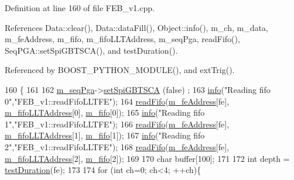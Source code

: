 Definition at line 160 of file F\+E\+B\+\_\+v1.\+cpp.



References Data\+::clear(), Data\+::data\+Fill(), Object\+::info(), m\+\_\+ch, m\+\_\+data, m\+\_\+fe\+Address, m\+\_\+fifo, m\+\_\+fifo\+L\+L\+T\+Address, m\+\_\+seq\+Pga, read\+Fifo(), Seq\+P\+G\+A\+::set\+Spi\+G\+B\+T\+S\+C\+A(), and test\+Duration().



Referenced by B\+O\+O\+S\+T\+\_\+\+P\+Y\+T\+H\+O\+N\+\_\+\+M\+O\+D\+U\+L\+E(), and ext\+Trig().


\begin{DoxyCode}
160                                              \{
161 
162   \hyperlink{classFEB__v1_a6c7804ac86796f233a8393043adf2e77}{m\_seqPga}->\hyperlink{classSeqPGA_ae5449d6970bffd8de3670a8a1ce6942d}{setSpiGBTSCA} (\textcolor{keyword}{false}) ;
163   \hyperlink{classObject_a644fd329ea4cb85f54fa6846484b84a8}{info}(\textcolor{stringliteral}{"Reading fifo 0"},\textcolor{stringliteral}{"FEB\_v1::readFifoLLTFE"});
164   \hyperlink{classFEB__v1_af945f99a912c5ad076ebdb03dbb6c139}{readFifo}(\hyperlink{classFEB__v1_a4e1945c2d5b434125f375e9d0fc6d99f}{m\_feAddress}[fe], \hyperlink{classFEB__v1_a68be75ba59d1c551163a9596dc1d235a}{m\_fifoLLTAddress}[0], 
      \hyperlink{classFEB__v1_ae5b770f2f5ffb97324862c93e3153985}{m\_fifo}[0]);
165   \hyperlink{classObject_a644fd329ea4cb85f54fa6846484b84a8}{info}(\textcolor{stringliteral}{"Reading fifo 1"},\textcolor{stringliteral}{"FEB\_v1::readFifoLLTFE"});
166   \hyperlink{classFEB__v1_af945f99a912c5ad076ebdb03dbb6c139}{readFifo}(\hyperlink{classFEB__v1_a4e1945c2d5b434125f375e9d0fc6d99f}{m\_feAddress}[fe], \hyperlink{classFEB__v1_a68be75ba59d1c551163a9596dc1d235a}{m\_fifoLLTAddress}[1], 
      \hyperlink{classFEB__v1_ae5b770f2f5ffb97324862c93e3153985}{m\_fifo}[1]);
167   \hyperlink{classObject_a644fd329ea4cb85f54fa6846484b84a8}{info}(\textcolor{stringliteral}{"Reading fifo 2"},\textcolor{stringliteral}{"FEB\_v1::readFifoLLTFE"});
168   \hyperlink{classFEB__v1_af945f99a912c5ad076ebdb03dbb6c139}{readFifo}(\hyperlink{classFEB__v1_a4e1945c2d5b434125f375e9d0fc6d99f}{m\_feAddress}[fe], \hyperlink{classFEB__v1_a68be75ba59d1c551163a9596dc1d235a}{m\_fifoLLTAddress}[2], 
      \hyperlink{classFEB__v1_ae5b770f2f5ffb97324862c93e3153985}{m\_fifo}[2]);
169   
170   \textcolor{keywordtype}{char} buffer[100];
171   
172   \textcolor{keywordtype}{int} depth = \hyperlink{classFEB__v1_a7f1db8ca9490172fce7603da9e703dec}{testDuration}(fe);
173 
174   \textcolor{keywordflow}{for} (\textcolor{keywordtype}{int} ch=0; ch<4; ++ch)\{

\end{DoxyCode}
